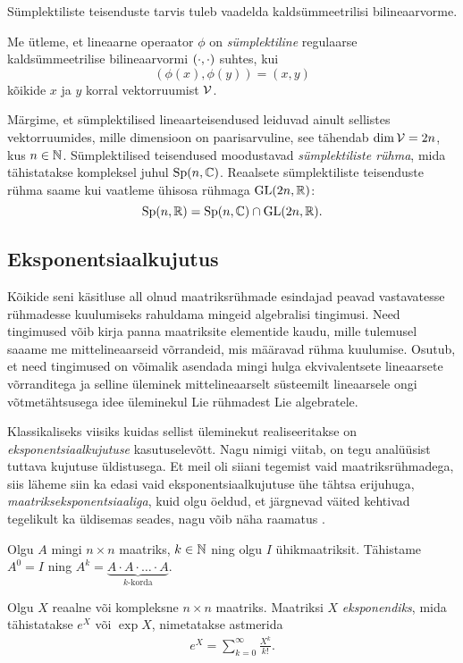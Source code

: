 Sümplektiliste teisenduste tarvis tuleb vaadelda kaldsümmeetrilisi
bilineaarvorme.

\begin{dfn}
    Me ütleme, et lineaarne operaator $\phi$ on \emph{sümplektiline}
    regulaarse kaldsümmeetrilise bilineaarvormi $\left( \cdot, \cdot \right)$ suhtes, kui
    \[ (\phi(x), \phi(y)) = (x, y) \]
    kõikide $x$ ja $y$ korral vektorruumist $\mathcal{V}$.
\end{dfn}

Märgime, et sümplektilised lineaarteisendused leiduvad ainult sellistes
vektorruumides, mille dimensioon on paarisarvuline, see tähendab
$\dim \mathcal{V} = 2n$, kus $n \in \mathbb{N}$. Sümplektilised teisendused moodustavad
\emph{sümplektiliste rühma}, mida tähistatakse kompleksel juhul
$\operatorname{Sp}(n, \mathbb{C})$. Reaalsete sümplektiliste
teisenduste rühma saame kui vaatleme ühisosa rühmaga $\operatorname{GL}(2n, \mathbb{R})$:
\[ \operatorname{Sp}(n, \mathbb{R}) = \operatorname{Sp}(n, \mathbb{C}) \cap \operatorname{GL}(2n, \mathbb{R}). \]


\subsection{Eksponentsiaalkujutus}

Kõikide seni käsitluse all olnud maatriksrühmade esindajad peavad
vastavatesse rühmadesse kuulumiseks rahuldama mingeid algebralisi tingimusi.
Need tingimused võib kirja panna maatriksite elementide kaudu, mille
tulemusel saaame me mittelineaarseid võrrandeid, mis määravad rühma kuulumise.
Osutub, et need tingimused on võimalik asendada mingi hulga ekvivalentsete
lineaarsete võrranditega ja selline üleminek mittelineaarselt süsteemilt
lineaarsele ongi võtmetähtsusega idee üleminekul Lie rühmadest Lie
algebratele.\cite{johan1989survey}

Klassikaliseks viisiks kuidas sellist üleminekut realiseeritakse on
\emph{eksponentsiaalkujutuse} kasutuselevõtt. Nagu nimigi viitab, on
tegu analüüsist tuttava kujutuse üldistusega. Et meil oli siiani tegemist
vaid maatriksrühmadega, siis läheme siin ka edasi vaid eksponentsiaalkujutuse
ühe tähtsa erijuhuga, \emph{maatrikseksponentsiaaliga}, kuid olgu öeldud,
et järgnevad väited kehtivad tegelikult ka üldisemas seades,
nagu võib näha raamatus \cite{kirillov2008introduction}.

Olgu $A$ mingi $n \times n$ maatriks, $k \in \mathbb{N}$ ning olgu $I$
ühikmaatriksit. Tähistame $A^0 = I$ ning
$A^k = \underbrace{A \cdot A \cdot \ldots \cdot A}_{k\text{-korda}}$.

\begin{dfn}
    Olgu $X$ reaalne või kompleksne $n \times n$ maatriks. Maatriksi
    $X$ \emph{eksponendiks}, mida tähistatakse $e^X$ või $\exp X$, nimetatakse
    astmerida
    \begin{align}\label{eq:mat-exp}
        e^X = \sum_{k=0}^{\infty} \frac{X^k}{k!}.
    \end{align}
\end{dfn}


